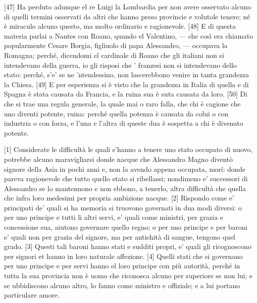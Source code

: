 {[}47{]} Ha perduto adunque el re Luigi la Lombardia per non avere
osservato alcuno di quelli termini osservati da altri che hanno preso
provincie e volutole tenere; né è miraculo alcuno questo, ma molto
ordinario e ragionevole. {[}48{]} E di questa materia parlai a Nantes
con Roano, quando el Valentino, --- che così era chiamato popularmente
Cesare Borgia, figliuolo di papa Alessandro, --- occupava la Romagna;
perché, dicendomi el cardinale di Roano che gli italiani non si
intendevano della guerra, io gli risposi che ' franzesi non si
intendevano dello stato: perché, s'e' se ne 'ntendessino, non
lascerebbono venire in tanta grandezza la Chiesa. {[}49{]} E per
esperienza si è visto che la grandezza in Italia di quella e di Spagna è
stata causata da Francia, e la ruina sua è suta causata da loro.
{[}50{]} Di che si trae una regula generale, la quale mai o raro falla,
che chi è cagione che uno diventi potente, ruina: perché quella potenza
è causata da colui o con industria o con forza, e l'una e l'altra di
queste dua è sospetta a chi è divenuto potente.


{[}1{]} Considerate le difficultà le quali s'hanno a tenere uno stato
occupato di nuovo, potrebbe alcuno maravigliarsi donde nacque che
Alessandro Magno diventò signore della Asia in pochi anni e, non la
avendo appena occupata, morí: donde pareva ragionevole che tutto quello
stato si ribellassi; nondimeno e' successori di Alessandro se lo
mantennono e non ebbono, a tenerlo, altra difficultà che quella che
infra loro medesimi per propria ambizione nacque. {[}2{]} Rispondo come
e' principati de' quali si ha memoria si truovono governati in dua modi
diversi: o per uno principe e tutti li altri servi, e' quali come
ministri, per grazia e concessione sua, aiutono governare quello regno;
o per uno principe e per baroni e' quali non per grazia del signore, ma
per antichità di sangue, tengono quel grado. {[}3{]} Questi tali baroni
hanno stati e sudditi propri, e' quali gli ricognoscono per signori et
hanno in loro naturale affezione. {[}4{]} Quelli stati che si governano
per uno principe e per servi hanno el loro principe con più autorità,
perché in tutta la sua provincia non è uomo che riconosca alcuno per
superiore se non lui; e se ubbidiscono alcuno altro, lo fanno come ministro e offiziale; e a lui portano particulare amore.

